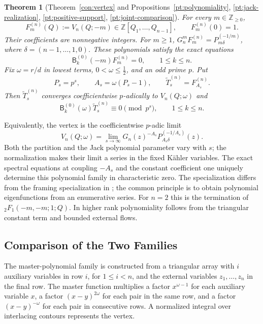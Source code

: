 \documentclass[11pt]{amsart}
\newtheorem{theorem}{Theorem}[section]
\theoremstyle{definition}
\theoremstyle{remark}
\numberwithin{equation}{section}
\newcommand{\Z}{\mathbb Z}
\begin{document}
\begin{theorem}[Theorem~\ref{con:vertex} and
Propositions~\ref{pt:polynomiality}, \ref{pt:jack-realization},
\ref{pt:positive-support}, \ref{pt:joint-comparison}]
\label{in:polynomial-theorem}
For every $m\in\Z_{\geq0}$,
\[
 F_m^{(n)}(Q):=V_n(Q;-m)\in\Z[Q_1,\ldots,Q_{n-1}],
 \qquad F_m^{(n)}(0)=1.
\]
Their coefficients are nonnegative integers. For $m\geq1$,
$G_n^mF_m^{(n)}=P_{m\delta}^{(-1/m)}$, where
$\delta=(n-1,\ldots,1,0)$.
These polynomials satisfy the exact equations
\[
 \mathsf B_k^{(0)}(-m)F_m^{(n)}=0,\qquad 1\leq k\leq n.
\]
Fix $\omega=r/d$ in lowest terms, $0<\omega\leq\tfrac12$,
and an odd prime $p$. Put
\[
 P_s=p^s,\qquad A_s=\omega(P_s-1),\qquad
 \widetilde T_s^{(n)}=F_{A_s}^{(n)}.
\]
Then $\widetilde T_s^{(n)}$ converges coefficientwise
$p$-adically to $V_n(Q;\omega)$ and
\[
 \mathsf B_k^{(0)}(\omega)\widetilde T_s^{(n)}
 \equiv0\pmod{p^s},\qquad 1\leq k\leq n.
\]
\end{theorem}

Equivalently, the vertex is the coefficientwise $p$-adic limit
\[
 V_n(Q;\omega)
 =\lim_{s\to\infty}G_n(z)^{-A_s}
    P_{A_s\delta}^{(-1/A_s)}(z).
\]
Both the partition and the Jack polynomial parameter vary with $s$; the
normalization makes their limit a series in the fixed K\"ahler
variables. The exact spectral equations at coupling $-A_s$
and the constant coefficient one uniquely determine this
polynomial family in characteristic zero.
The specialization differs from the
framing specialization in \cite{K21}; the common principle is
to obtain polynomial eigenfunctions from an enumerative series.
For $n=2$ this is the termination of
${}_2F_1(-m,-m;1;Q)$. In higher rank polynomiality follows from
the triangular constant term and bounded external flows.

\subsection{Comparison of the Two Families}
The master-polynomial family is constructed from a triangular
array with $i$ auxiliary variables in row $i$, for
$1\leq i<n$, and the external variables $z_1,\ldots,z_n$ in
the final row. The master function multiplies a factor
$x^{\omega-1}$ for each auxiliary variable $x$, a factor
$(x-y)^{2\omega}$ for each pair in the same row, and a factor
$(x-y)^{-\omega}$ for each pair in consecutive rows. A normalized
integral over interlacing contours represents the vertex.
\end{document}
